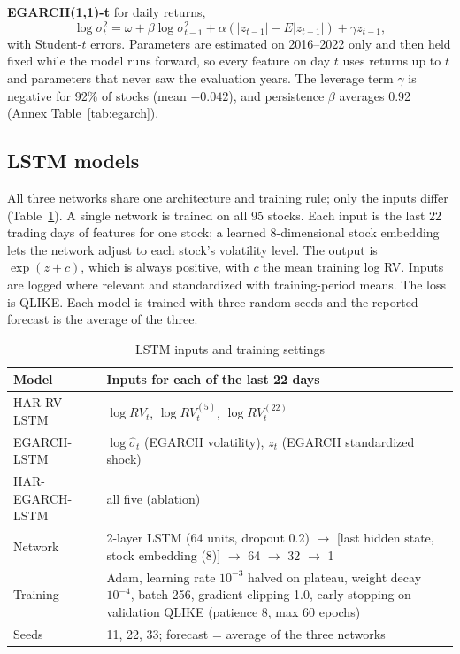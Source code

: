 \textbf{EGARCH(1,1)-t} \citep{nelson1991} for daily returns,
\begin{equation}
\log\sigma_t^2=\omega+\beta\log\sigma_{t-1}^2+\alpha\left(|z_{t-1}|-E|z_{t-1}|\right)+\gamma z_{t-1},
\end{equation}
with Student-$t$ errors. Parameters are estimated on 2016--2022 only and then held fixed while the
model runs forward, so every feature on day $t$ uses returns up to $t$ and parameters that never saw
the evaluation years. The leverage term $\gamma$ is negative for 92\% of stocks (mean $-0.042$),
and persistence $\beta$ averages 0.92 (Annex Table~\ref{tab:egarch}).

\subsection{LSTM models}

All three networks share one architecture and training rule; only the inputs differ
(Table~\ref{tab:lstm}). A single network is trained on all 95 stocks. Each input is the last 22
trading days of features for one stock; a learned 8-dimensional stock embedding lets the network
adjust to each stock's volatility level. The output is $\exp(z+c)$, which is always positive, with
$c$ the mean training log RV. Inputs are logged where relevant and standardized with training-period
means. The loss is QLIKE. Each model is trained with three random seeds and the reported forecast is
the average of the three.

\begin{table}[htbp]
\centering
\caption{LSTM inputs and training settings}
\label{tab:lstm}
\small
\begin{tabularx}{\textwidth}{lX}
\toprule
Model & Inputs for each of the last 22 days \\
\midrule
HAR-RV-LSTM & $\log RV_t$, $\log RV^{(5)}_t$, $\log RV^{(22)}_t$ \\
EGARCH-LSTM & $\log \hat\sigma_t$ (EGARCH volatility), $z_t$ (EGARCH standardized shock) \\
HAR-EGARCH-LSTM & all five (ablation) \\
\midrule
Network & 2-layer LSTM (64 units, dropout 0.2) $\rightarrow$ [last hidden state, stock embedding (8)] $\rightarrow$ 64 $\rightarrow$ 32 $\rightarrow$ 1 \\
Training & Adam, learning rate $10^{-3}$ halved on plateau, weight decay $10^{-4}$, batch 256, gradient clipping 1.0, early stopping on validation QLIKE (patience 8, max 60 epochs) \\
Seeds & 11, 22, 33; forecast = average of the three networks \\
\bottomrule
\end{tabularx}
\end{table}

